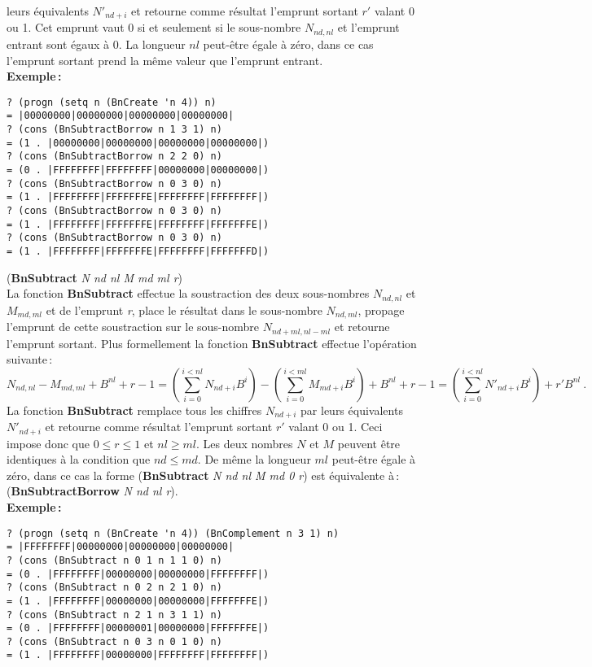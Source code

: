leurs \'equivalents $N'_{nd+i}$ et retourne comme r\'esultat l'emprunt sortant
$r'$ valant 0 ou 1. Cet emprunt vaut 0 si et seulement si le sous-nombre
$N_{nd,nl}$ et l'emprunt entrant sont \'egaux \`a 0. La longueur $nl$
peut-\^etre \'egale \`a z\'ero, dans ce cas l'emprunt sortant prend la m\^eme
valeur que l'emprunt entrant.
\\[18pt]
{\bf Exemple\,:}
\begin{verbatim}
? (progn (setq n (BnCreate 'n 4)) n)
= |00000000|00000000|00000000|00000000|
? (cons (BnSubtractBorrow n 1 3 1) n)
= (1 . |00000000|00000000|00000000|00000000|)
? (cons (BnSubtractBorrow n 2 2 0) n)
= (0 . |FFFFFFFF|FFFFFFFF|00000000|00000000|)
? (cons (BnSubtractBorrow n 0 3 0) n)
= (1 . |FFFFFFFF|FFFFFFFE|FFFFFFFF|FFFFFFFF|)
? (cons (BnSubtractBorrow n 0 3 0) n)
= (1 . |FFFFFFFF|FFFFFFFE|FFFFFFFF|FFFFFFFE|)
? (cons (BnSubtractBorrow n 0 3 0) n)
= (1 . |FFFFFFFF|FFFFFFFE|FFFFFFFF|FFFFFFFD|)
\end{verbatim}
\vspace*{24pt}
({\bf BnSubtract} {\em N nd nl M md ml r})
\\[12pt]
La fonction {\bf BnSubtract} effectue la soustraction des deux
sous-nombres $N_{nd,nl}$ et $M_{md,ml}$ et de l'emprunt {\em r}, 
place le r\'esultat dans le sous-nombre $N_{nd,ml}$, propage l'emprunt 
de cette soustraction sur le sous-nombre $N_{nd+ml,nl-ml}$ et retourne
l'emprunt sortant.  Plus formellement la fonction {\bf BnSubtract}
effectue l'op\'eration suivante\,:
\[ N_{nd,nl} - M_{md,ml} + B^{nl} + r - 1 = (\sum_{i=0}^{i<nl}N_{nd+i} B^i) - (\sum_{i=0}^{i<ml}M_{md+i} B^i) + B^{nl} + r - 1 = (\sum_{i=0}^{i<nl}N'_{nd+i} B^i) + r' B^{nl}\ .\]
La fonction {\bf BnSubtract} remplace tous les chiffres $N_{nd+i}$ par leurs
\'equivalents $N'_{nd+i}$ et retourne comme r\'esultat l'emprunt sortant $r'$
valant 0 ou 1. Ceci impose donc que $0 \leq r \leq 1$ et $nl \geq ml$.
Les deux nombres $N$ et $M$ peuvent \^etre identiques \`a la condition que
$nd \leq md$. De m\^eme la longueur $ml$ peut-\^etre \'egale \`a z\'ero, dans ce
cas la forme ({\bf BnSubtract} {\em N nd nl M md 0 r}) est \'equivalente \`a\,:
({\bf BnSubtractBorrow} {\em N nd nl r}).
\\[18pt]
{\bf Exemple\,:}
\begin{verbatim}
? (progn (setq n (BnCreate 'n 4)) (BnComplement n 3 1) n)
= |FFFFFFFF|00000000|00000000|00000000|
? (cons (BnSubtract n 0 1 n 1 1 0) n)
= (0 . |FFFFFFFF|00000000|00000000|FFFFFFFF|)
? (cons (BnSubtract n 0 2 n 2 1 0) n)
= (1 . |FFFFFFFF|00000000|00000000|FFFFFFFE|)
? (cons (BnSubtract n 2 1 n 3 1 1) n)
= (0 . |FFFFFFFF|00000001|00000000|FFFFFFFE|)
? (cons (BnSubtract n 0 3 n 0 1 0) n)
= (1 . |FFFFFFFF|00000000|FFFFFFFF|FFFFFFFF|)
\end{verbatim}
\vspace*{15pt}


